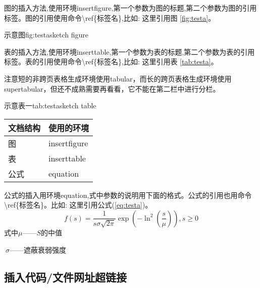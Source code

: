 图的插入方法,使用环境insertfigure,第一个参数为图的标题,第二个参数为图的引用标签。图的引用使用命令\textbackslash ref\{标签名\},比如: 这里引用图
\ref{fig:testa}。

\begin{insertfigure}{示意图}{fig:testa}{sketch figure}
  \centering
\end{insertfigure}

表的插入方法,使用环境inserttable,第一个参数为表的标题,第二个参数为表的引用标签。表的引用使用命令\textbackslash ref\{标签名\},比如: 这里引用表
\ref{tab:testa}。

注意短的非跨页表格生成环境使用tabular，而长的跨页表格生成环境使用supertabular，但还不成熟需要再看看，它不能在第二栏中进行分栏。

\begin{inserttable}{示意表一}{tab:testa}{sketch table}%
  \begin{tabular}{p{}p{}}
    \toprule
    文档结构 & 使用的环境 \\ \midrule
    图 & insertfigure \\
    表 & inserttable \\
    公式 & equation \\
    \bottomrule
  \end{tabular}
\end{inserttable}

公式的插入用环境equation,式中参数的说明用下面的格式。公式的引用也用命令\textbackslash ref\{标签名\}。比如: 这里引用公式(\ref{eq:testa})。
\begin{equation}\label{eq:testa}
f(s)=\frac{1}{s\sigma\sqrt{2\pi}}\exp\left(-\ln^2\left(\frac{s}{\mu}\right)\right), s \geq 0
\end{equation}
式中$\mu$——$S$的中值

$~\sigma$——遮蔽衰弱强度

\subsection{插入代码/文件网址超链接}

